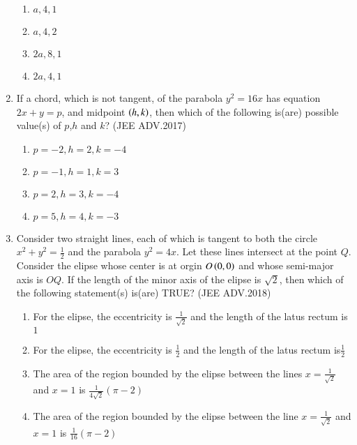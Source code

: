 \documentclass[journal,12pt,onecolumn]{IEEEtran}
\theoremstyle{remark}
\begin{document}
\begin{enumerate}
	      \begin{enumerate}
		      \item $a,4,1$
		      \item $a,4,2$
		      \item $2a,8,1$
		      \item $2a,4,1$
	      \end{enumerate}
      \item If a chord, which is not tangent, of the parabola $y^2=16x$ has equation $2x+y=p$, and midpoint $\left(h,k\right)$, then which of the following is(are) possible value(s) of $p$,$h$ and $k$? 
	      \hfill(JEE ADV.2017)
	      
	      \begin{enumerate}
		      \item $p=-2,h=2,k=-4$
		      \item $p=-1,h=1,k=3$
		      \item $p=2,h=3,k=-4$
		      \item $p=5,h=4,k=-3$


	      \end{enumerate}
      \item Consider two straight lines, each of which is tangent to both the circle $x^2+y^2=\frac{1}{2}$
	      and the parabola $y^2=4x$. Let these lines intersect at the point $Q$. Consider the elipse whose center is at orgin $O\left(0,0\right)$ and whose semi-major axis is $OQ$.
	      If the length of the minor axis of the elipse is $\sqrt{2}$, then which of the following statement(s) is(are) TRUE? 
	      \hfill(JEE ADV.2018)
	      
	      \begin{enumerate}
		      \item For the elipse, the eccentricity is $\frac{1}{\sqrt{2}}$ and the length of the latus rectum is $1$

		      \item For the elipse, the eccentricity is $\frac{1}{2}$ and the length of the latus rectum is$\frac{1}{2}$
		      \item The area of the region bounded by the elipse between the lines $x=\frac{1}{\sqrt{2}}$ and $x=1$ is $\frac{1}{4\sqrt{2}}(\pi-2)$
		      \item The area of the region bounded by the elipse between the line $x=\frac{1}{\sqrt{2}}$ and $x=1$ is $\frac{1}{16}(\pi-2)$
	      \end{enumerate}

\end{enumerate}
\end{document}

